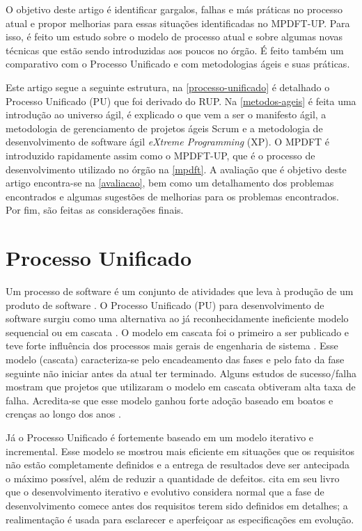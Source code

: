 \documentclass[
	article,			%
	11pt,				%
	oneside,			%
	a4paper,			%
	english,			%
	brazil,				%
	sumario=tradicional
	]{abntex2}
\begin{document}
O objetivo deste artigo é identificar gargalos, falhas e más práticas no
processo atual e propor melhorias para essas situações identificadas no
MPDFT-UP. Para isso, é feito um estudo sobre o modelo de processo atual e sobre
algumas novas técnicas que estão sendo introduzidas aos poucos no órgão. É feito
também um comparativo com o Processo Unificado e com metodologias ágeis e suas
práticas.

Este artigo segue a seguinte estrutura, na \autoref{processo-unificado} é
detalhado o Processo Unificado (PU) que foi derivado do RUP. Na
\autoref{metodos-ageis} é feita uma introdução ao universo ágil, é explicado o
que vem a ser o manifesto ágil, a metodologia de gerenciamento de projetos ágeis
Scrum e a metodologia de desenvolvimento de software ágil \textit{eXtreme
Programming} (XP). O MPDFT é introduzido rapidamente assim como o MPDFT-UP, que
é o processo de desenvolvimento utilizado no órgão na \autoref{mpdft}. A
avaliação que é objetivo deste artigo encontra-se na \autoref{avaliacao}, bem
como um detalhamento dos problemas encontrados e algumas sugestões de melhorias
para os problemas encontrados. Por fim, são feitas as considerações finais.

\section{Processo Unificado}

\label{processo-unificado}

Um processo de software é um conjunto de atividades que leva à produção de um
produto de software \cite{sommerville2007}. O Processo Unificado (PU) para
desenvolvimento de software surgiu como uma alternativa ao já reconhecidamente
ineficiente modelo sequencial ou em cascata \cite{jacobson1999unified}.
O modelo em cascata foi o primeiro a ser publicado e teve forte influência dos
processos mais gerais de engenharia de sistema \cite{sommerville2007}. Esse
modelo (cascata) caracteriza-se pelo encadeamento das fases e pelo fato da fase
seguinte não iniciar antes da atual ter terminado. Alguns estudos de
sucesso/falha mostram que projetos que utilizaram o modelo em cascata obtiveram
alta taxa de falha. Acredita-se que esse modelo ganhou forte adoção baseado em
boatos e crenças ao longo dos anos \cite{larman2007utilizando}.

Já o Processo Unificado é fortemente baseado em um modelo
iterativo e incremental. Esse modelo se mostrou mais eficiente em situações que os
requisitos não estão completamente definidos e a entrega de resultados deve ser
antecipada o máximo possível, além de reduzir a quantidade de defeitos.
 cita em seu livro que o desenvolvimento
iterativo e evolutivo considera normal que a fase de desenvolvimento comece
antes dos requisitos terem sido definidos em detalhes; a realimentação é usada
para esclarecer e aperfeiçoar as especificações em evolução.
\end{document}
